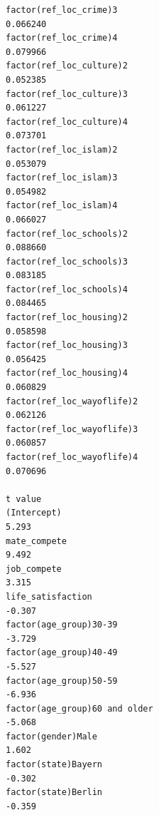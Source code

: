 \documentclass[
]{article}
\begin{document}
\begin{table}
\begin{minipage}[t]{\linewidth}
{\begin{verbatim}
factor(ref_loc_crime)3                                                              0.066240
factor(ref_loc_crime)4                                                              0.079966
factor(ref_loc_culture)2                                                            0.052385
factor(ref_loc_culture)3                                                            0.061227
factor(ref_loc_culture)4                                                            0.073701
factor(ref_loc_islam)2                                                              0.053079
factor(ref_loc_islam)3                                                              0.054982
factor(ref_loc_islam)4                                                              0.066027
factor(ref_loc_schools)2                                                            0.088660
factor(ref_loc_schools)3                                                            0.083185
factor(ref_loc_schools)4                                                            0.084465
factor(ref_loc_housing)2                                                            0.058598
factor(ref_loc_housing)3                                                            0.056425
factor(ref_loc_housing)4                                                            0.060829
factor(ref_loc_wayoflife)2                                                          0.062126
factor(ref_loc_wayoflife)3                                                          0.060857
factor(ref_loc_wayoflife)4                                                          0.070696
                                                                                  t value
(Intercept)                                                                         5.293
mate_compete                                                                        9.492
job_compete                                                                         3.315
life_satisfaction                                                                  -0.307
factor(age_group)30-39                                                             -3.729
factor(age_group)40-49                                                             -5.527
factor(age_group)50-59                                                             -6.936
factor(age_group)60 and older                                                      -5.068
factor(gender)Male                                                                  1.602
factor(state)Bayern                                                                -0.302
factor(state)Berlin                                                                -0.359

\end{verbatim}}
\end{minipage}
\end{table}
\end{document}

